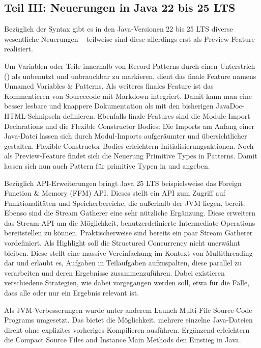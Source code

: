 \subsection{Teil III: Neuerungen in Java 22 bis 25 LTS}


Bezüglich der Syntax gibt es in den Java-Versionen 22 bis 25 LTS diverse  wesentliche Neuerungen -- teilweise
sind diese allerdings erst als Preview-Feature realisiert.


Um Variablen oder Teile innerhalb von Record Patterns durch einen Unterstrich (\frqq\code{\_}\flqq{})
als unbenutzt und unbrauchbar zu markieren, dient das finale Feature namens \frqq Unnamed Variables \& Patterns\flqq{}.
Als weiteres finales Feature ist das Kommentieren von Sourcecode mit Markdown integriert.
Damit kann man eine besser lesbare und knappere Dokumentation als mit den bisherigen JavaDoc-HTML-Schnipseln definieren. Ebenfalls finale Features sind die Module Import Declarations und die Flexible Constructor Bodies:
Die Imports am Anfang einer Java-Datei lassen sich durch Modul-Imports aufgeräumter  und übersichtlicher gestalten.
Flexible Constructor Bodies erleichtern Initialisierungsaktionen.
Noch als Preview-Feature findet sich die Neuerung Primitive Types in Patterns. Damit
lassen sich nun auch Pattern für primitive Typen in  und 
angeben.


Bezüglich API-Erweiterungen bringt Java 25 LTS beispielsweise
das Foreign Function \& Memory (FFM)  API. Dieses
stellt ein API zum Zugriff auf Funktionalitäten und Speicherbereiche, die außerhalb der JVM liegen, bereit.
Ebenso sind die Stream Gatherer  eine sehr nützliche Ergänzung. Diese erweitern das Stream-API um
die Möglichkeit, benutzerdefinierte Intermediate Operations bereitstellen zu können.
Praktischerweise sind bereits ein paar Stream Gatherer  vordefiniert.
 Als Highlight soll die Structured Concurrency nicht unerwähnt bleiben.
 Diese stellt eine massive Vereinfachung im Kontext von Multi\-threading dar und  erlaubt es,
 Aufgaben in Teil\-aufgaben aufzuspalten, diese  parallel zu verarbeiten und deren Ergebnisse  zusammenzuführen.
 Dabei existieren verschiedene Strategien, wie dabei vorgegangen werden soll, etwa für die Fälle, dass alle oder nur
 ein Ergebnis relevant ist.


Als JVM-Verbesserungen wurde unter anderem Launch Multi-File Source-Code Programs umgesetzt.
Das bietet die Möglichkeit, mehrere einzelne Java-Dateien direkt ohne explizites vorheriges Kompilieren ausführen.
Ergänzend erleichtern die Compact Source Files and Instance Main Methods den Einstieg in  Java.




